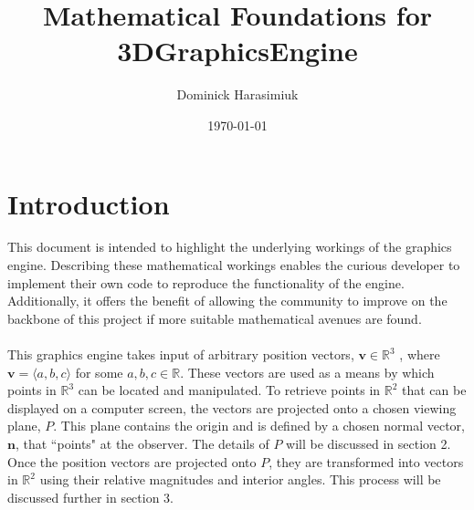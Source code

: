 \documentclass{article}
\title{Mathematical Foundations for 3DGraphicsEngine}
\author{Dominick Harasimiuk}
\date{\today}
\begin{document}
\maketitle

\section{Introduction}
This document is intended to highlight the underlying workings of the graphics engine. Describing these mathematical workings
enables the curious developer to implement their own code to reproduce the functionality of the engine. Additionally, it offers the benefit
of allowing the community to improve on the backbone of this project if more suitable mathematical avenues are found.
\\\\
This graphics engine takes input of arbitrary position vectors, $\textbf{v} \in \mathbb{R}^3$ , where $ \textbf{v} = \langle a,b,c \rangle$
for some $a,b,c \in \mathbb{R}$. These vectors are used as a means by which points in $\mathbb{R}^3$ can be located and manipulated. To retrieve points
in $ \mathbb{R}^2$ that can be displayed on a computer screen, the vectors are projected onto a chosen viewing plane, $P$. This plane contains the origin
and is defined by a chosen normal vector, $\textbf{n}$, that ``points" at the observer. The details of $P$ will be discussed in section 2. Once the
position vectors are projected onto $P$, they are transformed into vectors in $\mathbb{R}^2$ using their relative magnitudes and interior angles. This
process will be discussed further in section 3.
\end{document}
